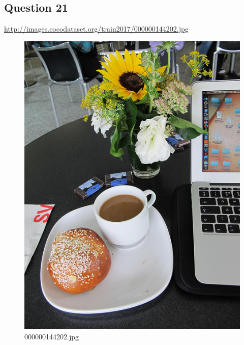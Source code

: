 \subsection*{Question 21}
\url{http://images.cocodataset.org/train2017/000000144202.jpg}
    \begin{figure}[h]
        \centering
        \includegraphics[width=0.8\linewidth]{../image set/easy/000000144202.jpg}
        \caption{000000144202.jpg}
    \end{figure}
